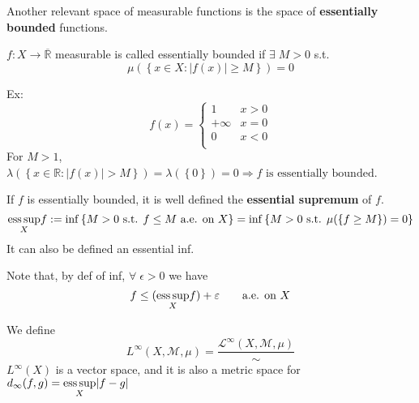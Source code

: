 Another relevant space of measurable functions is the space of \textbf{essentially bounded} functions.
\begin{definition}
    \(f : X \to \overline{\mathbb{R}}\) measurable is called essentially bounded if \(\exists \; M > 0\) s.t.
    \[
        \mu(\left\lbrace x \in X : \vert f(x) \vert \geq M \right\rbrace) = 0
    \]
\end{definition}
Ex: 
\[f(x) = \begin{cases}
    1 & x > 0 \\
+\infty & x = 0 \\
0 & x < 0 \\
\end{cases}
\] 
For \(M > 1\), \(\lambda(\left\lbrace x \in \mathbb{R} : \vert f(x) \vert > M\right\rbrace) = \lambda(\left\lbrace 0 \right\rbrace) = 0 \Rightarrow f\mbox{ is essentially bounded}\).


If \(f\) is essentially bounded, it is well defined the \textbf{essential supremum} of \(f\).
\[
    \underset{X}{\text{ess}\, \text{sup}} f := \inf \left\lbrace M > 0 \mbox{ s.t. } f \leq M \mbox{ a.e. on }X\right\rbrace = \inf \left\lbrace M > 0 \mbox{ s.t. } \mu(\{f \geq M \})=0 \right\rbrace
\]
It can also be defined an essential inf.
\begin{remark}
    Note that, by def of inf, \(\forall \; \epsilon > 0\) we have 
    \[
        f \leq (\underset{X}{\text{ess}\, \text{sup}} f) + \varepsilon \qquad \text{a.e. on }X
    \]
\end{remark}
We define 
\[
    L^{\infty} (X, \mathcal{M}, \mu) = \frac{\mathcal{L}^{\infty}(X, \mathcal{M}, \mu)}{\sim}
\]
\(L^{\infty}(X)\) is a vector space, and it is also a metric space for \(d_{\infty}(f,g) = \underset{X}{\text{ess}\, \text{sup}} \vert f-g \vert\)

